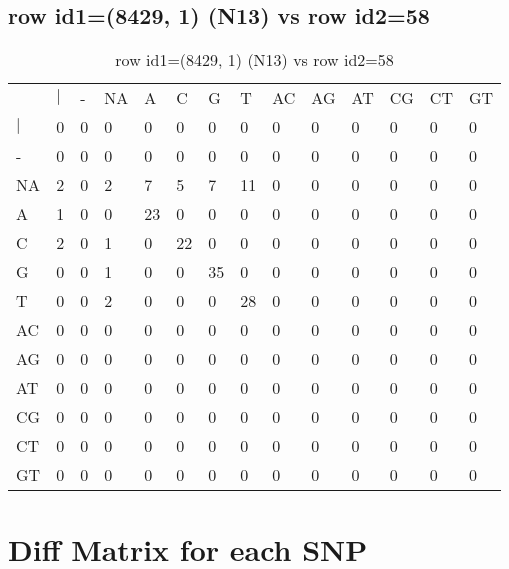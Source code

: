 \subsection{row id1=(8429, 1) (N13) vs row id2=58}
\begin{center}
\begin{longtable}{|l|l|l|l|l|l|l|l|l|l|l|l|l|l|}
\caption{row id1=(8429, 1) (N13) vs row id2=58} \label{table_dm492}\\
\hline
\\
\hline
&$|$&-&NA&A&C&G&T&AC&AG&AT&CG&CT&GT\\
$|$&0&0&0&0&0&0&0&0&0&0&0&0&0\\
-&0&0&0&0&0&0&0&0&0&0&0&0&0\\
NA&2&0&2&7&5&7&11&0&0&0&0&0&0\\
A&1&0&0&23&0&0&0&0&0&0&0&0&0\\
C&2&0&1&0&22&0&0&0&0&0&0&0&0\\
G&0&0&1&0&0&35&0&0&0&0&0&0&0\\
T&0&0&2&0&0&0&28&0&0&0&0&0&0\\
AC&0&0&0&0&0&0&0&0&0&0&0&0&0\\
AG&0&0&0&0&0&0&0&0&0&0&0&0&0\\
AT&0&0&0&0&0&0&0&0&0&0&0&0&0\\
CG&0&0&0&0&0&0&0&0&0&0&0&0&0\\
CT&0&0&0&0&0&0&0&0&0&0&0&0&0\\
GT&0&0&0&0&0&0&0&0&0&0&0&0&0\\
\hline
\end{longtable}
\end{center}

\section{Diff Matrix for each SNP} \label{section_snp_wise}
